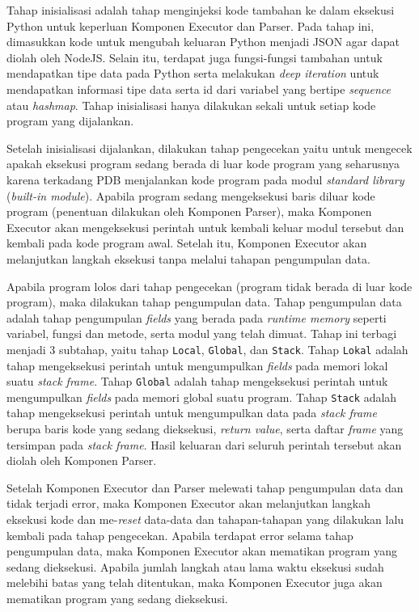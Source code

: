 Tahap inisialisasi adalah tahap menginjeksi kode tambahan ke dalam eksekusi Python untuk keperluan Komponen Executor dan Parser. Pada tahap ini, dimasukkan kode untuk mengubah keluaran Python menjadi JSON agar dapat diolah oleh NodeJS. Selain itu, terdapat juga fungsi-fungsi tambahan untuk mendapatkan tipe data pada Python serta melakukan \textit{deep iteration} untuk mendapatkan informasi tipe data serta id dari variabel yang bertipe \textit{sequence} atau \textit{hashmap}. Tahap inisialisasi hanya dilakukan sekali untuk setiap kode program yang dijalankan.

Setelah inisialisasi dijalankan, dilakukan tahap pengecekan yaitu untuk mengecek apakah eksekusi program sedang berada di luar kode program yang seharusnya karena terkadang PDB menjalankan kode program pada modul \textit{standard library} (\textit{built-in module}). Apabila program sedang mengeksekusi baris diluar kode program (penentuan dilakukan oleh Komponen Parser), maka Komponen Executor akan mengeksekusi perintah untuk kembali keluar modul tersebut dan kembali pada kode program awal. Setelah itu, Komponen Executor akan melanjutkan langkah eksekusi tanpa melalui tahapan pengumpulan data.

Apabila program lolos dari tahap pengecekan (program tidak berada di luar kode program), maka dilakukan tahap pengumpulan data. Tahap pengumpulan data adalah tahap pengumpulan \textit{fields} yang berada pada \textit{runtime memory} seperti variabel, fungsi dan metode, serta modul yang telah dimuat. Tahap ini terbagi menjadi 3 subtahap, yaitu tahap \verb|Local|, \verb|Global|, dan \verb|Stack|. Tahap \verb|Lokal| adalah tahap mengeksekusi perintah untuk mengumpulkan \textit{fields} pada memori lokal suatu \textit{stack frame}. Tahap \verb|Global| adalah tahap mengeksekusi perintah untuk mengumpulkan \textit{fields} pada memori global suatu program. Tahap \verb|Stack| adalah tahap mengeksekusi perintah untuk mengumpulkan data pada \textit{stack frame} berupa baris kode yang sedang dieksekusi, \textit{return value}, serta daftar \textit{frame} yang tersimpan pada \textit{stack frame}.
Hasil keluaran dari seluruh perintah tersebut akan diolah oleh Komponen Parser.

Setelah Komponen Executor dan Parser melewati tahap pengumpulan data dan tidak terjadi error, maka Komponen Executor akan melanjutkan langkah eksekusi kode dan me-\textit{reset} data-data dan tahapan-tahapan yang dilakukan lalu kembali pada tahap pengecekan. Apabila terdapat error selama tahap pengumpulan data, maka Komponen Executor akan mematikan program yang sedang dieksekusi. Apabila jumlah langkah atau lama waktu eksekusi sudah melebihi batas yang telah ditentukan, maka Komponen Executor juga akan mematikan program yang sedang dieksekusi.

